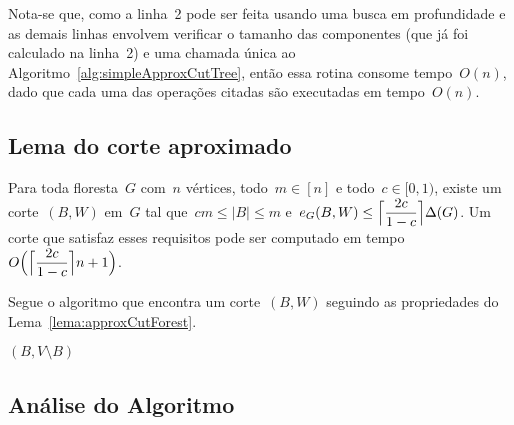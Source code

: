 	
	Nota-se que, como a linha~2 pode ser feita usando uma busca em 
	profundidade e as demais linhas envolvem verificar o tamanho 
	das componentes (que já foi calculado na linha~2) e uma 
	chamada única ao Algoritmo~\ref{alg:simpleApproxCutTree}, então 
	essa rotina consome tempo~$O(n)$, dado que cada uma 
	das operações citadas são executadas em tempo~$O(n)$. 

\bigskip
\bigskip
\bigskip



\subsection{Lema do corte aproximado}

\begin{lem}
\label{lema:approxCutForest}
	Para toda floresta~$G$ com~$n$ vértices, todo~${m \in [n]}$ e 
	todo~${c \in [0,1)}$, existe um corte~$(B,W)$ em~$G$ tal 
	que~${cm \le |B| \le m}$ 
	e~${e_G(B,W) \le \ceil[\Big]{ \dfrac{2c}{1-c}} \Delta(G)}$.
	Um corte que satisfaz esses requisitos pode ser computado em
	tempo~${O\Big(\ceil[\Big]{ \dfrac{2c}{1-c}} n+1\Big)}$.
\end{lem}


Segue o algoritmo que encontra um corte~$(B,W)$ seguindo
as propriedades do Lema~\ref{lema:approxCutForest}.

\begin{algorithm}[H]
\label{alg:approxCutForest}

	\caption{Computa corte aproximado em uma floresta}
	\Input{floresta~${G =(V,E)}$ com~$n$ vértices,~${m \in [n]}$ e
	${c\in [0, 1)}$}
	\Return $(B,V\setminus B)$\;

\end{algorithm}	
\subsection*{Análise do Algoritmo}


